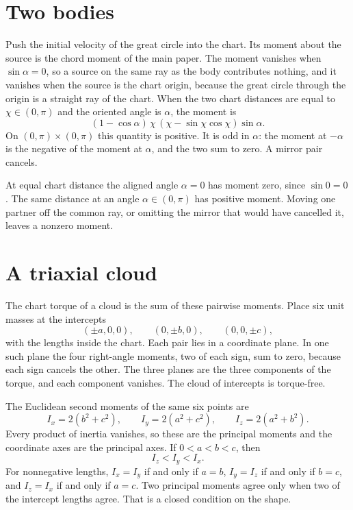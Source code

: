 \documentclass[a4paper]{article}
\begin{document}
\section{Two bodies}
\label{sec:two}

Push the initial velocity of the great circle into the chart. Its moment about the source is the chord moment of the main paper. The moment vanishes when \(\sin\alpha=0\), so a source on the same ray as the body contributes nothing, and it vanishes when the source is the chart origin, because the great circle through the origin is a straight ray of the chart. When the two chart distances are equal to \(\chi\in(0,\pi)\) and the oriented angle is \(\alpha\), the moment is
\begin{equation}
\label{eq:equal}
(1-\cos\alpha)\,\chi\,(\chi-\sin\chi\cos\chi)\sin\alpha.
\end{equation}
On \((0,\pi)\times(0,\pi)\) this quantity is positive. It is odd in \(\alpha\): the moment at \(-\alpha\) is the negative of the moment at \(\alpha\), and the two sum to zero. A mirror pair cancels.

At equal chart distance the aligned angle \(\alpha=0\) has moment zero, since \(\sin 0=0\). The same distance at an angle \(\alpha\in(0,\pi)\) has positive moment. Moving one partner off the common ray, or omitting the mirror that would have cancelled it, leaves a nonzero moment.

\section{A triaxial cloud}
\label{sec:cloud}

The chart torque of a cloud is the sum of these pairwise moments. Place six unit masses at the intercepts
\[
(\pm a,0,0),\qquad (0,\pm b,0),\qquad (0,0,\pm c),
\]
with the lengths inside the chart. Each pair lies in a coordinate plane. In one such plane the four right-angle moments, two of each sign, sum to zero, because each sign cancels the other. The three planes are the three components of the torque, and each component vanishes. The cloud of intercepts is torque-free.

The Euclidean second moments of the same six points are
\begin{equation}
\label{eq:inertia}
I_x=2(b^2+c^2),\qquad
I_y=2(a^2+c^2),\qquad
I_z=2(a^2+b^2).
\end{equation}
Every product of inertia vanishes, so these are the principal moments and the coordinate axes are the principal axes. If \(0<a<b<c\), then
\begin{equation}
\label{eq:order}
I_z<I_y<I_x.
\end{equation}
For nonnegative lengths, \(I_x=I_y\) if and only if \(a=b\), \(I_y=I_z\) if and only if \(b=c\), and \(I_z=I_x\) if and only if \(a=c\). Two principal moments agree only when two of the intercept lengths agree. That is a closed condition on the shape.
\end{document}
